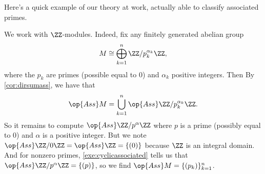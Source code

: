 Here's a quick example of our theory at work, actually able to classify associated primes.
\begin{ex}
	We work with $\ZZ$-modules. Indeed, fix any finitely generated abelian group
	\[M\cong\bigoplus_{k=1}^n\ZZ/p_k^{\alpha_k}\ZZ,\]
	where the $p_k$ are primes (possible equal to $0$) and $\alpha_k$ positive integers. Then By \autoref{cor:dirsumass}, we have that
	\[\op{Ass}M=\bigcup_{k=1}^n\op{Ass}\ZZ/p_k^{\alpha_k}\ZZ.\]
	So it remains to compute $\op{Ass}\ZZ/p^\alpha\ZZ$ where $p$ is a prime (possibly equal to $0$) and $\alpha$ is a positive integer. But we note $\op{Ass}\ZZ/0\ZZ=\op{Ass}\ZZ=\{(0)\}$ because $\ZZ$ is an integral domain. And for nonzero primes, \autoref{exe:cyclicassociated} tells us that $\op{Ass}\ZZ/p^\alpha\ZZ=\{(p)\}$, so we find $\op{Ass}M=\{(p_k)\}_{k=1}^n$.
\end{ex}


